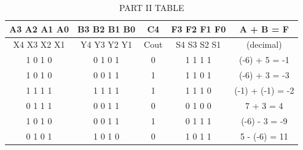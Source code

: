 \documentclass[10pt]{article}
\begin{document}
\begin{table}[H]
	\centering
	\caption{PART II TABLE}
	\label{tab:Table 1}
	\begin{tabular}{|c|c|c|c|c|}
		\hline
		A3 A2 A1 A0 & B3 B2 B1 B0 & C4 & F3 F2 F1 F0 & A + B = F \\ \hline
		X4 X3 X2 X1 & Y4 Y3 Y2 Y1 & Cout & S4 S3 S2 S1 & (decimal)\\ \hline
		1 0 1 0 & 0 1 0 1 & 0 & 1 1 1 1 & (-6) + 5 = -1 \\ \hline
		1 0 1 0 & 0 0 1 1 & 1 & 1 1 0 1 & (-6) + 3 = -3 \\ \hline
		1 1 1 1 & 1 1 1 1 & 1 & 1 1 1 0 & (-1) + (-1) = -2 \\ \hline
		0 1 1 1 & 0 0 1 1 & 0 & 0 1 0 0 & 7 + 3 = 4 \\ \hline
		1 0 1 0 & 0 0 1 1 & 1 & 0 1 1 1 & (-6) - 3 = -9 \\ \hline
		0 1 0 1 & 1 0 1 0 & 0 & 1 0 1 1 & 5 - (-6) = 11 \\ \hline
	\end{tabular}
\end{table}
\end{document}
